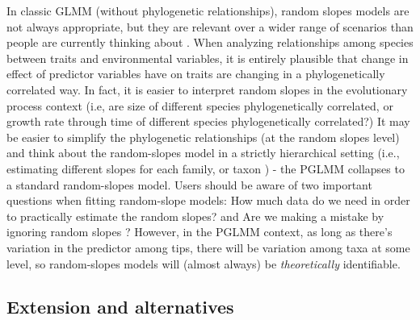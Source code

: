 In classic GLMM (without phylogenetic relationships), random slopes models are not always appropriate, but they are relevant over a wider range of scenarios than people are currently thinking about \cite{schielzeth2008conclusions, cleasby2015quantifying}.
When analyzing relationships among species between traits and environmental variables, it is entirely plausible that change in effect of predictor variables have on traits are changing in a phylogenetically correlated way.
In fact, it is easier to interpret random slopes in the evolutionary process context (i.e, are size of different species phylogenetically correlated, or growth rate through time of different species phylogenetically correlated?)
It may be easier to simplify the phylogenetic relationships (at the random slopes level) and think about the random-slopes model in a strictly hierarchical setting (i.e., estimating different slopes for each family, or taxon \cite{bunnefeld2012island}) - the PGLMM collapses to a standard random-slopes model. 
Users should be aware of two important questions when fitting random-slope models: How much data do we need in order to practically estimate the random slopes? and Are we making a mistake by ignoring random slopes \cite{schielzeth2008conclusions}? 
However, in the PGLMM context, as long as there's variation in the predictor among tips, there will be variation among taxa at some level, so random-slopes models will (almost always) be \emph{theoretically} identifiable.


\subsection{Extension and alternatives}

